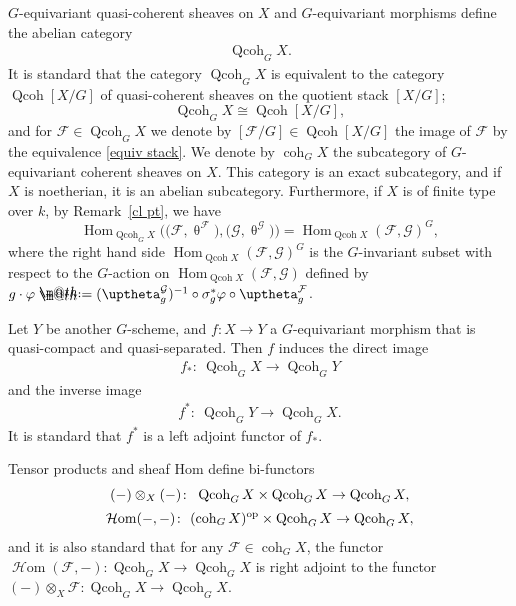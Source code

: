 \documentclass[10pt,a4paper]{amsart}
\makeatletter
\newcommand*{\defeq}{\mathrel{\rlap{%
 \raisebox{0.3ex}{$\m@th\cdot$}}%
 \raisebox{-0.3ex}{$\m@th\cdot$}}%
 =}
\numberwithin{equation}{section}
\newcommand{\Hom}{\operatorname{Hom}}
\newcommand{\cHom}{\operatorname{{\mathcal H}om}}
\newcommand{\coh}{\operatorname{coh}}
\newcommand{\Qcoh}{\operatorname{Qcoh}}
\newcommand{\cF}{\mathcal{F}}
\newcommand{\cG}{\mathcal{G}}
\makeatother
\begin{document}
$G$-equivariant quasi-coherent sheaves on $X$ and $G$-equivariant morphisms define the abelian category
\begin{gather*}
\Qcoh_GX.
\end{gather*}
It is standard that the category $\Qcoh_GX$ is equivalent to the category $\Qcoh [X/G]$ of quasi-coherent sheaves on the quotient stack $[X/G]$;
\begin{equation}\label{equiv stack}
\Qcoh_GX\cong \Qcoh [X/G],
\end{equation}
 and for $\cF\in \Qcoh_GX$ we denote by $[\cF/G]\in \Qcoh [X/G]$ the image of $\cF$ by the equivalence \eqref{equiv stack}. We denote by $\coh_GX$ the subcategory of $G$-equivariant coherent sheaves on $X$. This category is an exact subcategory, and if $X$ is noetherian, it is an abelian subcategory. Furthermore, if $X$ is of finite type over $k$, by Remark~\ref{cl pt}, we have
\begin{equation}\label{G hom}
\Hom_{\Qcoh_GX}\big(\big(\cF,\uptheta^{\cF}\big),\big(\cG,\uptheta^{\cG}\big)\big) =\Hom_{\Qcoh X}(\cF,\cG)^G,
\end{equation}
where the right hand side $\Hom_{\Qcoh X}(\cF,\cG)^G$ is the $G$-invariant subset with respect to the $G$-action on $\Hom_{\Qcoh X}(\cF,\cG)$ defined by
$g\cdot\varphi\defeq (\uptheta^{\cG}_g)^{-1}\circ\sigma_g^*\varphi\circ\uptheta^{\cF}_g$.

Let $Y$ be another $G$-scheme, and $f\colon X\to Y$ a $G$-equivariant morphism that is quasi-compact and quasi-separated. Then $f$ induces the direct image\vspace{-.5ex}
\begin{gather*}
f_*\colon\ \Qcoh_G X\to \Qcoh_G Y
\end{gather*}
and the inverse image\vspace{-.5ex}
\begin{gather*}
f^*\colon\ \Qcoh_G Y\to \Qcoh_GX.
\end{gather*}
It is standard that $f^*$ is a left adjoint functor of $f_*$.

Tensor products and sheaf Hom define bi-functors
\begin{gather*}
(-)\otimes_{X}(-)\colon\ \Qcoh_G X\times \Qcoh_G X\to \Qcoh_G X,
\\[.5ex]
\cHom(-,-)\colon\ (\coh_G X)^{\rm op}\times \Qcoh_G X\to \Qcoh_G X,
\end{gather*}
and it is also standard that for any $\cF\in \coh_GX$, the functor $\cHom(\cF,-)\colon\Qcoh_G X\to \Qcoh_G X$ is right adjoint to the functor $(-)\otimes_{X}\cF\colon\Qcoh_G X\to \Qcoh_G X$.
\end{document}

